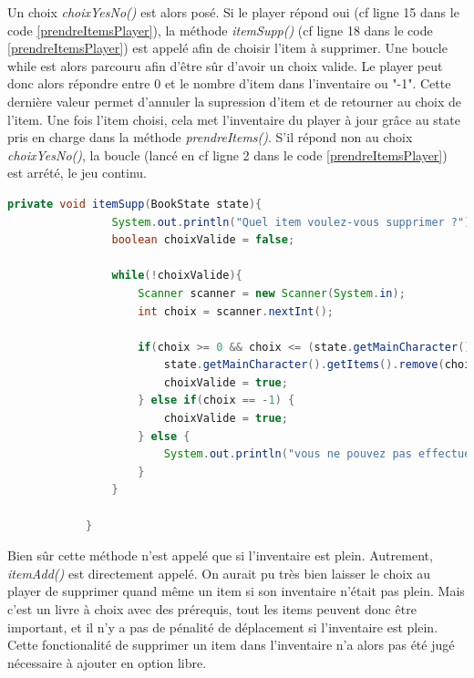 		Un choix \textit{choixYesNo()} est alors posé. Si le player répond oui (cf ligne 15 dans le code \ref{prendreItemsPlayer}), la méthode \textit{itemSupp()} (cf ligne 18 dans le code \ref{prendreItemsPlayer}) est appelé afin de choisir l'item à supprimer. Une boucle while est alors parcouru afin d'être sûr d'avoir un choix valide. Le player peut donc alors répondre entre 0 et le nombre d'item dans l'inventaire ou "-1". Cette dernière valeur permet d'annuler la supression d'item et de retourner au choix de l'item. Une fois l'item choisi, cela met l'inventaire du player à jour grâce au state pris en charge dans la méthode \textit{prendreItems()}. S'il répond non au choix \textit{choixYesNo()}, la boucle (lancé en cf ligne 2 dans le code \ref{prendreItemsPlayer}) est arrété, le jeu continu.

		\begin{lstlisting}[gobble=12, language=java, label=itemSupp, caption=itemSupp()]
			private void itemSupp(BookState state){
				System.out.println("Quel item voulez-vous supprimer ?");
				boolean choixValide = false;

				while(!choixValide){
					Scanner scanner = new Scanner(System.in);
					int choix = scanner.nextInt();

					if(choix >= 0 && choix <= (state.getMainCharacter().getItems().size()-1)){
						state.getMainCharacter().getItems().remove(choix);
						choixValide = true;
					} else if(choix == -1) {
						choixValide = true;
					} else {
						System.out.println("vous ne pouvez pas effectuer ce choix");
					}
				}

			}
		\end{lstlisting}

		Bien sûr cette méthode n'est appelé que si l'inventaire est plein. Autrement, \textit{itemAdd()} est directement appelé. On aurait pu très bien laisser le choix au player de supprimer quand même un item si son inventaire n'était pas plein. Mais c'est un livre à choix avec des prérequis, tout les items peuvent donc être important, et il n'y a pas de pénalité de déplacement si l'inventaire est plein. Cette fonctionalité de supprimer un item dans l'inventaire n'a alors pas été jugé nécessaire à ajouter en option libre.


